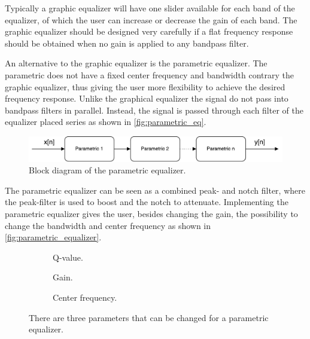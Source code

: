 Typically a graphic equalizer will have one slider available for each band of the equalizer, of which the user can increase or decrease the gain of each band. The graphic equalizer should be designed very carefully if a flat frequency response should be obtained when no gain is applied to any bandpass filter.

An alternative to the graphic equalizer is the parametric equalizer. The parametric does not have a fixed center frequency and bandwidth contrary the graphic equalizer, thus giving the user more flexibility to achieve the desired frequency response. Unlike the graphical equalizer the signal do not pass into bandpass filters in parallel. Instead, the signal is passed through each filter of the equalizer placed series as shown in \autoref{fig:parametric_eq}. \\


\begin{figure}[H]
\centering
\includegraphics[width=0.8 \textwidth]{figures/parametric_eq.pdf}
\caption{Block diagram of the parametric equalizer.}
\label{fig:parametric_eq}
\end{figure}

The parametric equalizer can be seen as a combined peak- and notch filter, where the peak-filter is used to boost and the notch to attenuate. Implementing the parametric equalizer gives the user, besides changing the gain, the possibility to change the bandwidth and center frequency as shown in \autoref{fig:parametric_equalizer}.


\begin{figure}[H]
\centering
\hspace*{-1cm}
\begin{subfigure}[t]{0.3\textwidth}
	
	\caption{Q-value.}
	\label{fig:parametric_q}
\end{subfigure}
\hspace{2mm} 
\begin{subfigure}[t]{0.3\textwidth}
	
	\caption{Gain.}
	\label{fig:parametric_db}
\end{subfigure}
\hspace{2mm}
\begin{subfigure}[t]{0.3\textwidth}
	
	\caption{Center frequency.}
	\label{fig:parametric_fc}
\end{subfigure}
\caption{There are three parameters that can be changed for a parametric equalizer.}
\label{fig:parametric_equalizer}
\end{figure}

